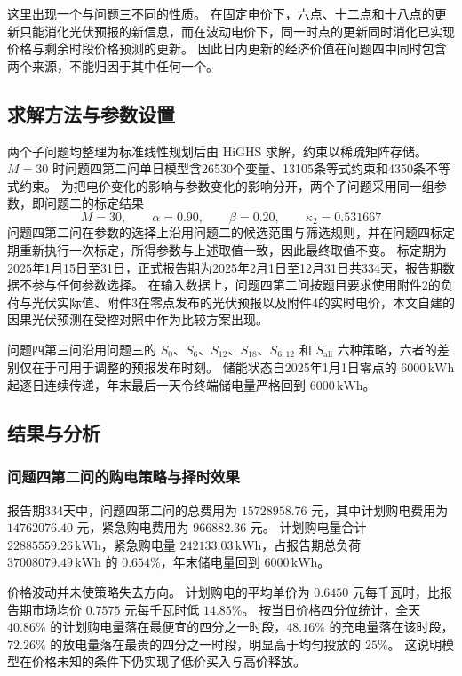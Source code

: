 这里出现一个与问题三不同的性质。
在固定电价下，六点、十二点和十八点的更新只能消化光伏预报的新信息，而在波动电价下，同一时点的更新同时消化已实现价格与剩余时段价格预测的更新。
因此日内更新的经济价值在问题四中同时包含两个来源，不能归因于其中任何一个。

\subsection{求解方法与参数设置}

两个子问题均整理为标准线性规划后由 HiGHS 求解，约束以稀疏矩阵存储。
\(M=30\) 时问题四第二问单日模型含26530个变量、13105条等式约束和4350条不等式约束。
为把电价变化的影响与参数变化的影响分开，两个子问题采用同一组参数，即问题二的标定结果
\begin{equation}
M=30,
\qquad
\alpha=0.90,
\qquad
\beta=0.20,
\qquad
\kappa_2=0.531667
\label{eq:q4_parameters}
\end{equation}
问题四第二问在参数的选择上沿用问题二的候选范围与筛选规则，并在问题四标定期重新执行一次标定，所得参数与上述取值一致，因此最终取值不变。
标定期为2025年1月15日至31日，正式报告期为2025年2月1日至12月31日共334天，报告期数据不参与任何参数选择。
在输入数据上，问题四第二问按题目要求使用附件2的负荷与光伏实际值、附件3在零点发布的光伏预报以及附件4的实时电价，本文自建的因果光伏预测在受控对照中作为比较方案出现。

问题四第三问沿用问题三的 \(S_0\)、\(S_6\)、\(S_{12}\)、\(S_{18}\)、\(S_{6,12}\) 和 \(S_{\mathrm{all}}\) 六种策略，六者的差别仅在于可用于调整的预报发布时刻。
储能状态自2025年1月1日零点的 \(6000\,\mathrm{kWh}\) 起逐日连续传递，年末最后一天令终端储电量严格回到 \(6000\,\mathrm{kWh}\)。

\subsection{结果与分析}

\subsubsection{问题四第二问的购电策略与择时效果}

报告期334天中，问题四第二问的总费用为
\(15728958.76\) 元，其中计划购电费用为
\(14762076.40\) 元，紧急购电费用为
\(966882.36\) 元。
计划购电量合计 \(22885559.26\,\mathrm{kWh}\)，紧急购电量
\(242133.03\,\mathrm{kWh}\)，占报告期总负荷 \(37008079.49\,\mathrm{kWh}\) 的 \(0.654\%\)，年末储电量回到 \(6000\,\mathrm{kWh}\)。

价格波动并未使策略失去方向。
计划购电的平均单价为 \(0.6450\) 元每千瓦时，比报告期市场均价 \(0.7575\) 元每千瓦时低 \(14.85\%\)。
按当日价格四分位统计，全天 \(40.86\%\) 的计划购电量落在最便宜的四分之一时段，\(48.16\%\) 的充电量落在该时段，\(72.26\%\) 的放电量落在最贵的四分之一时段，明显高于均匀投放的 \(25\%\)。
这说明模型在价格未知的条件下仍实现了低价买入与高价释放。

